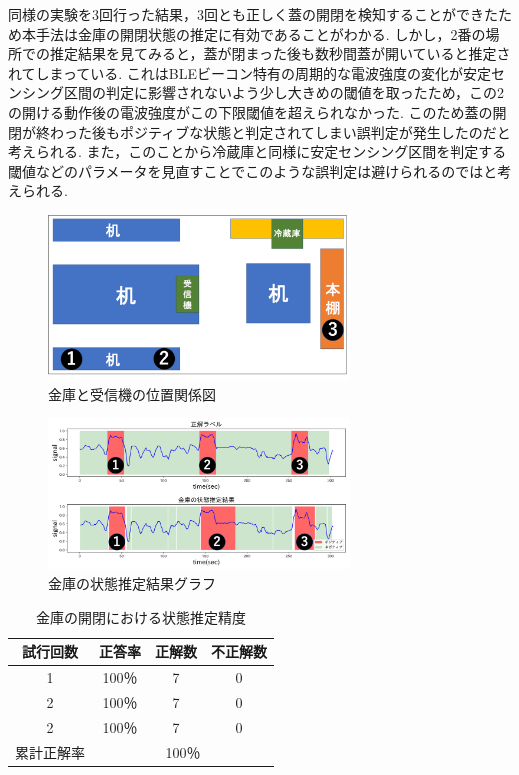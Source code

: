 \documentclass[Japanese]{dicomopapers}
\begin{document}
同様の実験を3回行った結果，3回とも正しく蓋の開閉を検知することができたため本手法は金庫の開閉状態の推定に有効であることがわかる.
しかし，2番の場所での推定結果を見てみると，蓋が閉まった後も数秒間蓋が開いていると推定されてしまっている.
これはBLEビーコン特有の周期的な電波強度の変化が安定センシング区間の判定に影響されないよう少し大きめの閾値を取ったため，この2の開ける動作後の電波強度がこの下限閾値を超えられなかった.
このため蓋の開閉が終わった後もポジティブな状態と判定されてしまい誤判定が発生したのだと考えられる.
また，このことから冷蔵庫と同様に安定センシング区間を判定する閾値などのパラメータを見直すことでこのような誤判定は避けられるのではと考えられる.

\begin{figure}[ht]
    \centering
    \includegraphics[width=8cm]{kinko_position_fig.png}
    \caption{金庫と受信機の位置関係図}
    \label{kinko_position}
\end{figure}

\begin{figure}[ht]
    \centering
    \includegraphics[width=8cm]{kinko_graph.png}
    \caption{金庫の状態推定結果グラフ}
    \label{kinko_graph}
\end{figure}

\begin{table}[htb]
    \begin{center}
        \caption{金庫の開閉における状態推定精度}
        \label{kinko_fig}
        \begin{tabular}{|c|c|c|c|} \hline
        試行回数 & 正答率 & 正解数 & 不正解数 \\ \hline
        1 & 100％ & 7 & 0 \\ \hline
        2 & 100％ & 7 & 0 \\ \hline
        2 & 100％ & 7 & 0 \\ \hline \hline
        累計正解率 & \multicolumn{3}{c|}{100％} \\ \hline
        \end{tabular}
    \end{center}
\end{table}
\end{document}
